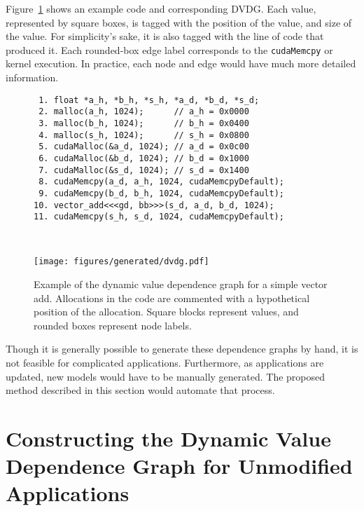 Figure~\ref{fig:dvdg} shows an example code and corresponding DVDG.
Each value, represented by square boxes, is tagged with the position of the value, and size of the value.
For simplicity's sake, it is also tagged with the line of code that produced it.
Each rounded-box edge label corresponds to the \texttt{cudaMemcpy} or kernel execution.
In practice, each node and edge would have much more detailed information.

\begin{figure}[ht]
	\centering
        \begin{minipage}{\textwidth}
            \begin{lstlisting}
 1. float *a_h, *b_h, *s_h, *a_d, *b_d, *s_d;
 2. malloc(a_h, 1024);      // a_h = 0x0000
 3. malloc(b_h, 1024);      // b_h = 0x0400
 4. malloc(s_h, 1024);      // s_h = 0x0800
 5. cudaMalloc(&a_d, 1024); // a_d = 0x0c00  
 6. cudaMalloc(&b_d, 1024); // b_d = 0x1000
 7. cudaMalloc(&s_d, 1024); // s_d = 0x1400
 8. cudaMemcpy(a_d, a_h, 1024, cudaMemcpyDefault);
 9. cudaMemcpy(b_d, b_h, 1024, cudaMemcpyDefault);
10. vector_add<<<gd, bb>>>(s_d, a_d, b_d, 1024);
11. cudaMemcpy(s_h, s_d, 1024, cudaMemcpyDefault);
            \end{lstlisting}
        \end{minipage}        
    \\
        \begin{minipage}{\textwidth}
            \centering
            \texttt{[image: figures/generated/dvdg.pdf]}

        \end{minipage}
        \caption[Dynamic value dependence graph]{
            Example of the dynamic value dependence graph for a simple vector add.
            Allocations in the code are commented with a hypothetical position of the allocation.
            Square blocks represent values, and rounded boxes represent node labels.
        }
        \label{fig:dvdg}
\end{figure}

Though it is generally possible to generate these dependence graphs by hand, it is not feasible for complicated applications.
Furthermore, as applications are updated, new models would have to be manually generated.
The proposed method described in this section would automate that process.

\section{Constructing the Dynamic Value Dependence Graph for Unmodified Applications}

